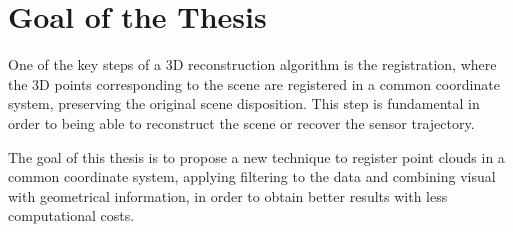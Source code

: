 \section{Goal of the Thesis} 

One of the key steps of a 3D reconstruction algorithm is the registration, where the 3D points corresponding to
 the scene are  registered in a common coordinate system, preserving the original scene disposition. This step is 
 fundamental in order to being able to reconstruct the scene or recover the sensor trajectory.

The goal of this thesis is to propose a new technique to register point clouds in a common coordinate system, applying 
filtering to the data and combining visual with geometrical information, in order to obtain better results with less 
computational costs. 





